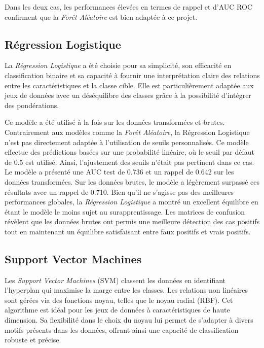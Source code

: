 \documentclass[a4paper,12pt]{report}
\begin{document}
Dans les deux cas, les performances élevées en termes de rappel et d'AUC ROC confirment que la \textit{Forêt Aléatoire} est bien adaptée à ce projet.

\subsection{Régression Logistique}

La \textit{Régression Logistique} a été choisie pour sa simplicité, son efficacité en classification binaire et sa capacité à fournir une interprétation claire des relations entre les caractéristiques et la classe cible. Elle est particulièrement adaptée aux jeux de données avec un déséquilibre des classes grâce à la possibilité d'intégrer des pondérations.

Ce modèle a été utilisé à la fois sur les données transformées et brutes. Contrairement aux modèles comme la \textit{Forêt Aléatoire}, la Régression Logistique n’est pas directement adaptée à l’utilisation de seuils personnalisés. Ce modèle effectue des prédictions basées sur une probabilité linéaire, où le seuil par défaut de 0.5 est utilisé. Ainsi, l'ajustement des seuils n'était pas pertinent dans ce cas.
\bigbreak
Le modèle a présenté une AUC test de 0.736 et un rappel de 0.642 sur les données transformées. Sur les données brutes, le modèle a légèrement surpassé ces résultats avec un rappel de 0.710. Bien qu'il ne s'agisse pas des meilleures performances globales, la \textit{Régression Logistique} a montré un excellent équilibre en étant le modèle le moins sujet au surapprentissage. Les matrices de confusion révèlent que les données brutes ont permis une meilleure détection des cas positifs tout en maintenant un équilibre satisfaisant entre faux positifs et vrais positifs.

\subsection{Support Vector Machines}

Les \textit{Support Vector Machines} (SVM) classent les données en identifiant l’hyperplan qui maximise la marge entre les classes. Les relations non linéaires sont gérées via des fonctions noyau, telles que le noyau radial (RBF). Cet algorithme est idéal pour les jeux de données à caractéristiques de haute dimension. Sa flexibilité dans le choix du noyau lui permet de s’adapter à divers motifs présents dans les données, offrant ainsi une capacité de classification robuste et précise.
\end{document}
